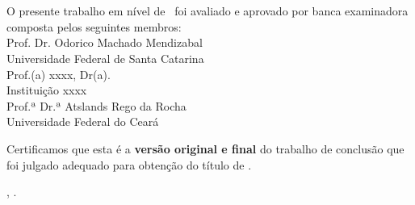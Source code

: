\imprimircapa

\imprimirfolhaderosto*

\begin{fichacatalografica}
	
\end{fichacatalografica}

\begin{folhadeaprovacao}
	\OnehalfSpacing
	\centering
	\imprimirautor\\%
	\vspace*{10pt}		
	\textbf{\imprimirtitulo}%
	\ifnotempty{\imprimirsubtitulo}{:~\imprimirsubtitulo}\\%
	\vspace*{\baselineskip}
	O presente trabalho em nível de \imprimirnivel~foi avaliado e aprovado por banca examinadora composta pelos seguintes membros:\\
	\vspace*{\baselineskip}
	Prof. Dr. Odorico Machado Mendizabal \\
	Universidade Federal de Santa Catarina \\
	\vspace*{\baselineskip}
	Prof.(a) xxxx, Dr(a).\\
	Instituição xxxx\\
        \vspace*{\baselineskip}
	Prof.ª Dr.ª Atslands Rego da Rocha \\
	Universidade Federal do Ceará \\
	\vspace*{2\baselineskip}
	\begin{minipage}{\textwidth}
		Certificamos que esta é a \textbf{versão original e final} do trabalho de conclusão que foi julgado adequado para obtenção do título de \imprimirformacao.\\
	\end{minipage}
	\vspace*{\fill}
	\vspace*{\fill}
	\assinatura{\OnehalfSpacing\imprimirorientador \\ \imprimirorientadorRotulo}
	\vspace*{\fill}
	\imprimirlocal, \imprimirano.
\end{folhadeaprovacao}

